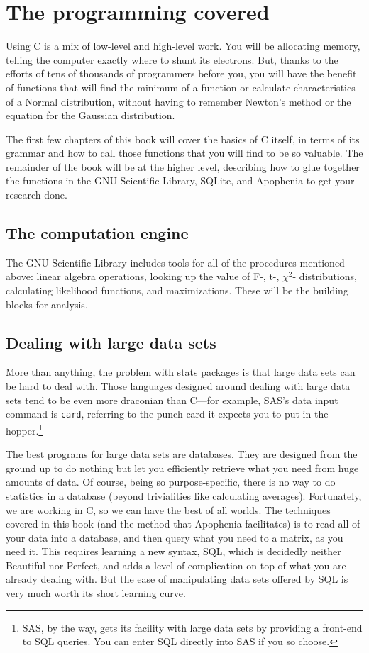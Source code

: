 \documentclass[12pt,notitlepage, openany]{book}
\def\ind#1{\index{#1}#1}
\begin{document}
\section{The programming covered}

Using C is a mix of low-level and high-level
work. You will be allocating memory, telling the computer exactly where
to shunt its electrons. But, thanks to the efforts of tens of thousands
of programmers before you, you will have the benefit of functions that
will find the minimum of a function or calculate characteristics of a
Normal distribution, without having to remember Newton's method or
the equation for the Gaussian distribution.

The first few chapters of this book will cover the basics of C itself,
in terms of its grammar and how to call those functions that
you will find to be so valuable. The remainder of the book will be at the higher
level, describing how to glue together the functions in the
GNU Scientific Library, SQLite, and Apophenia to get your research done.

\subsection{The computation engine} The \ind{GNU Scientific Library} includes tools for
all of the procedures mentioned above: linear algebra operations, looking up the
value of F-, t-, $\chi^2$- distributions, calculating likelihood functions, and
maximizations. These will be the building blocks for analysis.

\subsection{Dealing with large data sets} More than anything, the problem
with stats packages is that large data sets can be hard to deal
with. Those languages designed around dealing with large data
sets tend to be even more draconian than C---for example, SAS's data
input command is {\tt card}, referring to the punch card it expects you
to put in the hopper.\footnote{SAS, by the way, gets its facility with large data sets
by providing a front-end to SQL queries. You can enter SQL directly into
SAS if you so choose.}

The best programs for large data sets are \ind{databases}. They are
designed from the ground up to do nothing but let you efficiently
retrieve what you need from huge amounts of data.  Of course, being so
purpose-specific, there is no way to do statistics in a database (beyond
trivialities like calculating averages). Fortunately, we are working in
C, so we can have the best of all worlds. The techniques covered in this
book (and the method that Apophenia facilitates) is to read all of your
data into a database, and then query what you need to a matrix, as you
need it. This requires learning a new syntax, \ind{SQL}, which is decidedly
neither Beautiful nor Perfect, and adds a level of complication on top
of what you are already dealing with. But the ease of manipulating data
sets offered by SQL is very much worth its short learning curve.
\end{document}

